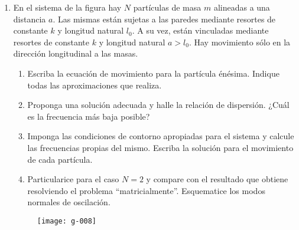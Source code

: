 \documentclass[11pt,spanish,a4paper]{article}
\begin{document}
\begin{enumerate}
\item
En el sistema de la figura hay \(N\) partículas de masa \(m\) alineadas a una distancia \(a\).
Las mismas están sujetas a las paredes mediante resortes de constante \(k\) y longitud natural \(l_0\).
A su vez, están vinculadas mediante resortes de constante \(k\) y longitud natural \(a > l_0\).
Hay movimiento sólo en la dirección longitudinal a las masas.
\begin{enumerate}
	\item Escriba la ecuación de movimiento para la partícula énésima.
	Indique todas las aproximaciones que realiza.
	\item Proponga una solución adecuada y halle la relación de dispersión.
	¿Cuál es la frecuencia más baja posible?
	\item Imponga las condiciones de contorno apropiadas para el sistema y calcule las frecuencias propias del mismo.
	Escriba la solución para el movimiento de cada partícula.
	\item Particularice para el caso \(N = 2\) y compare con el resultado que obtiene resolviendo el problema ``matricialmente''.
	Esquematice los modos normales de oscilación.	
\end{enumerate}
\begin{figure}[h]
	\centering
	\texttt{[image: g-008]}
\end{figure}




\end{enumerate}
\end{document}
